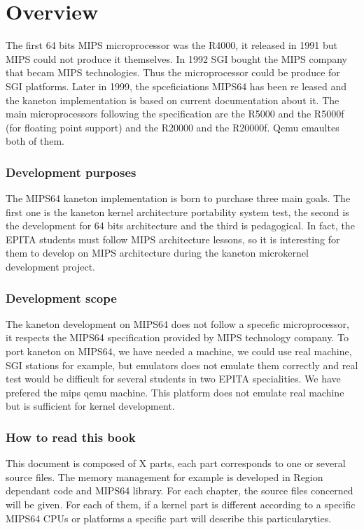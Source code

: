 %
%
%
%
%
%

%
%

\chapter{Overview}

The first 64 bits MIPS microprocessor was the R4000, it released in 1991 but MIPS could not produce it themselves. In 1992 SGI bought the MIPS company that becam MIPS technologies. Thus the microprocessor could be produce for SGI platforms. Later in 1999, the spceficiations MIPS64 has been re
leased and the kaneton implementation is based on current documentation about it. The main microprocessors following the specification are the R5000 and the R5000f (for floating point support) and the R20000 and the R20000f. Qemu emaultes both of them.

\subsection{Development purposes}

The MIPS64 kaneton implementation is born to purchase three main goals.
The first one is the kaneton kernel architecture portability system test,
the second is the development for 64 bits architecture and the third is pedagogical.
In fact, the EPITA students must follow MIPS architecture lessons, so it is interesting 
for them to develop on MIPS architecture during the kaneton microkernel development
project.

\subsection{Development scope}

The kaneton development on MIPS64 does not follow a specefic microprocessor, it respects the MIPS64 specification provided by MIPS technology company.
To port kaneton on MIPS64, we have needed a machine, we could use real machine, SGI stations for example, but emulators does not emulate them correctly and real test would be difficult for several students in two EPITA specialities. We have prefered the mips qemu machine. This platform does not emulate real machine but is sufficient for kernel development.

\subsection{How to read this book}

This document is composed of X parts, each part corresponds to one or several source files. The memory management for example is developed in Region dependant code and MIPS64 library. For each chapter, the source files concerned will be given.
For each of them, if a kernel part is different according to a specific MIPS64 CPUs or platforms a specific part will describe this particularyties.
